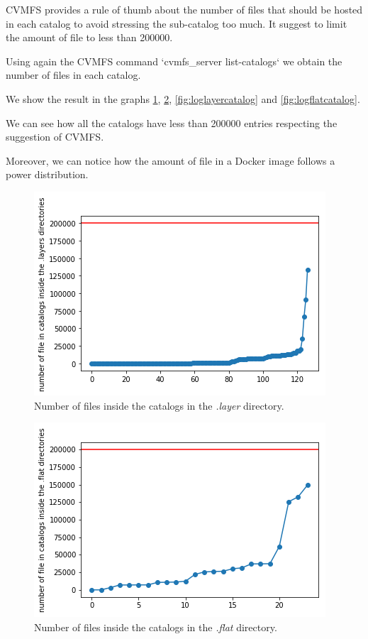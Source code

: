 CVMFS provides a rule of thumb about the number of files that should be hosted
in each catalog to avoid stressing the sub-catalog too much. It suggest to
limit the amount of file to less than 200000.

Using again the CVMFS command `cvmfs\_server list-catalogs` we obtain the
number of files in each catalog.

We show the result in the graphs \ref{fig:layercatalog}, \ref{fig:flatcatalog},
\ref{fig:loglayercatalog} and \ref{fig:logflatcatalog}.

We can see how all the catalogs have less than 200000 entries respecting the
suggestion of CVMFS.

Moreover, we can notice how the amount of file in a Docker image follows a
power distribution.

\begin{figure}[]{}
    \includegraphics[]{gfx/catalogs-layer}
        \caption{Number of files inside the catalogs in the \textit{.layer} directory.}
        \label{fig:layercatalog}
\end{figure}

\begin{figure}[]{}
    \includegraphics[]{gfx/catalogs-flat}
        \caption{Number of files inside the catalogs in the \textit{.flat} directory.}
        \label{fig:flatcatalog}
\end{figure}

